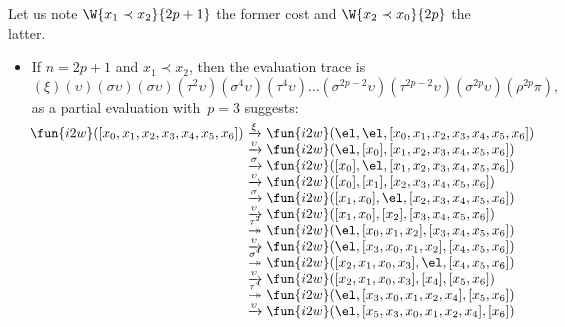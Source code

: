 Let us note \(\W{x_1 \prec x_2}{2p+1}\) the former cost and \(\W{x_2
  \prec x_0}{2p}\) the latter.
\begin{itemize}

\item If \(n = 2p+1\) and \(x_1 \prec x_2\), then the evaluation trace
  is
    \begin{equation*}
    (\xi)(\upsilon)(\sigma\upsilon)(\sigma\upsilon)
    (\tau^2\upsilon)(\sigma^4\upsilon)(\tau^4\upsilon) \ldots
    (\sigma^{2p-2}\upsilon)(\tau^{2p-2}\upsilon)(\sigma^{2p}\upsilon)
    (\rho^{2p}\pi),
    \end{equation*}
    as a partial evaluation with~\(p=3\) suggests:
    \begin{equation*}
      \!\begin{array}{@{}r@{\;}c@{\;}l@{}}
        \fun{i2w}([x_0,x_1,x_2,x_3,x_4,x_5,x_6])
        & \xrightarrow{\smash{\xi}}
        & \fun{i2w}(\el,\el,[x_0,x_1,x_2,x_3,x_4,x_5,x_6])\\
        & \xrightarrow{\smash{\upsilon}}
        & \fun{i2w}(\el,[x_0],[x_1,x_2,x_3,x_4,x_5,x_6])\\
        & \xrightarrow{\smash{\sigma}}
        & \fun{i2w}([x_0],\el,[x_1,x_2,x_3,x_4,x_5,x_6])\\
        & \xrightarrow{\smash{\upsilon}}
        & \fun{i2w}([x_0],[x_1],[x_2,x_3,x_4,x_5,x_6])\\
        & \xrightarrow{\smash{\sigma}}
        & \fun{i2w}([x_1,x_0],\el,[x_2,x_3,x_4,x_5,x_6])\\
        & \xrightarrow{\smash{\upsilon}}
        & \fun{i2w}([x_1,x_0],[x_2],[x_3,x_4,x_5,x_6])\\
        & \stackrel{\smash{\tau^{\smash{2}}}}{\twoheadrightarrow}
        & \fun{i2w}(\el,[x_0,x_1,x_2],[x_3,x_4,x_5,x_6])\\
        & \xrightarrow{\smash{\upsilon}}
        & \fun{i2w}(\el,[x_3,x_0,x_1,x_2],[x_4,x_5,x_6])\\
        & \stackrel{\smash{\sigma^{\smash{4}}}}{\twoheadrightarrow}
        & \fun{i2w}([x_2,x_1,x_0,x_3],\el,[x_4,x_5,x_6])\\
        & \xrightarrow{\smash{\upsilon}}
        & \fun{i2w}([x_2,x_1,x_0,x_3],[x_4],[x_5,x_6])\\
        & \stackrel{\smash{\tau^{\smash{4}}}}{\twoheadrightarrow}
        & \fun{i2w}(\el,[x_3,x_0,x_1,x_2,x_4],[x_5,x_6])\\
        & \xrightarrow{\smash{\upsilon}}
        & \fun{i2w}(\el,[x_5,x_3,x_0,x_1,x_2,x_4],[x_6])\\

\end{array}
\end{equation*}
\end{itemize}
